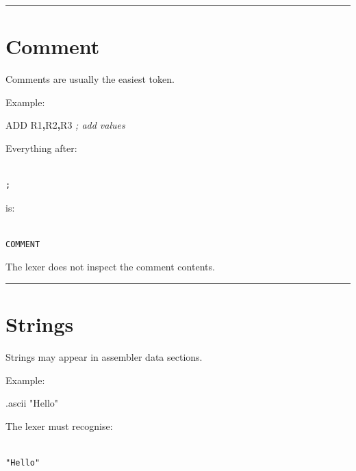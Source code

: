 \documentclass[
  oneside,
  openany]{book}
\newenvironment{Shaded}{\begin{snugshade}}{\end{snugshade}}
\newcommand{\BuiltInTok}[1]{#1}
\newcommand{\CommentTok}[1]{\textcolor[rgb]{0.56,0.35,0.01}{\textit{#1}}}
\newcommand{\NormalTok}[1]{#1}
\newcommand{\OperatorTok}[1]{\textcolor[rgb]{0.81,0.36,0.00}{\textbf{#1}}}
\newcommand{\StringTok}[1]{\textcolor[rgb]{0.31,0.60,0.02}{#1}}
\begin{document}
\begin{center}\rule{0.5\linewidth}{0.5pt}\end{center}

\hypertarget{comment}{%
\section{Comment}\label{comment}}

Comments are usually the easiest token.

Example:

\begin{Shaded}
\begin{Highlighting}[]
\BuiltInTok{ADD}\NormalTok{ R1}\OperatorTok{,}\NormalTok{R2}\OperatorTok{,}\NormalTok{R3    }\CommentTok{; add values}
\end{Highlighting}
\end{Shaded}

Everything after:

\begin{verbatim}

;
\end{verbatim}

is:

\begin{verbatim}

COMMENT
\end{verbatim}

The lexer does not inspect the comment contents.

\begin{center}\rule{0.5\linewidth}{0.5pt}\end{center}

\hypertarget{strings}{%
\section{Strings}\label{strings}}

Strings may appear in assembler data sections.

Example:

\begin{Shaded}
\begin{Highlighting}[]
\NormalTok{.ascii }\StringTok{"Hello"}
\end{Highlighting}
\end{Shaded}

The lexer must recognise:

\begin{verbatim}

"Hello"
\end{verbatim}
\end{document}

